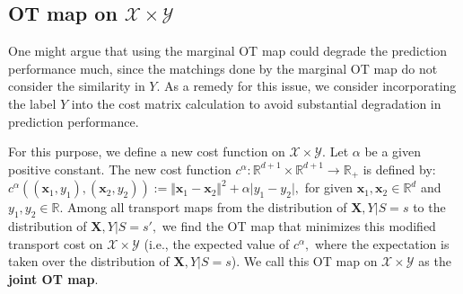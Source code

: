 \documentclass[10pt]{article} %
\begin{document}
\subsection{OT map on $\mathcal{X} \times \mathcal{Y}$}\label{sec:choiceT-relax}

One might argue that using the marginal OT map could degrade the prediction performance much, since the matchings done by the marginal OT map do not consider the similarity in $Y.$
As a remedy for this issue, we consider incorporating the label $Y$ into the cost matrix calculation to avoid substantial degradation in prediction performance.

For this purpose, we define a new cost function on $\mathcal{X} \times \mathcal{Y}.$
Let $\alpha$ be a given positive constant.
The new cost function $c^{\alpha}: \mathbb{R}^{d+1} \times \mathbb{R}^{d+1} \rightarrow \mathbb{R}_{+}$ is defined by:
$c^{\alpha}( (\mathbf{x}_{1}, y_{1}), (\mathbf{x}_{2}, y_{2}) ) := \Vert \mathbf{x}_{1} - \mathbf{x}_{2} \Vert^{2} + \alpha \vert y_{1} - y_{2} \vert, $ for given $\mathbf{x}_{1}, \mathbf{x}_{2} \in \mathbb{R}^{d}$ and $y_{1}, y_{2} \in \mathbb{R}.$
Among all transport maps from the distribution of $\mathbf{X}, Y | S = s$ to the distribution of $\mathbf{X}, Y | S = s',$ we find the OT map that minimizes this modified transport cost on $\mathcal{X} \times \mathcal{Y}$ (i.e., the expected value of $c^{\alpha},$ where the expectation is taken over the distribution of $\mathbf{X}, Y | S = s$).
We call this OT map on $\mathcal{X} \times \mathcal{Y}$ as the \textbf{joint OT map}.
\end{document}
